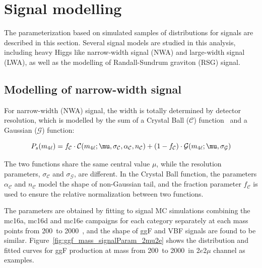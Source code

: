 \section{Signal modelling}
\label{sec:signal_model}

The parameterization based on simulated samples of \mfl distributions for signals are described in this section.
Several signal models are studied in this analysis, including heavy Higgs like narrow-width signal (NWA) and large-width signal (LWA), as well as the modelling of Randall-Sundrum graviton (RSG) signal.


\subsection{Modelling of narrow-width signal}
\label{sec:signal_nwa}

For narrow-width (NWA) signal, the \mfl width is totally determined by detector resolution, which is modelled 
by the sum of a Crystal Ball ($\mathcal{C}$) function~\cite{CrystalBall1,CrystalBall2} and a Gaussian ($\mathcal{G}$) function:

\begin{equation}
    \label{eq:cb_plus_g}
    P_{s} (\mfl) = f_{\mathcal{C}} \cdot \mathcal{C}(\mfl; \mu, \sigma_{\mathcal{C}}, \alpha_{\mathcal{C}}, n_{\mathcal{C}})
                   + (1 - f_{\mathcal{C}}) \cdot \mathcal{G}(\mfl; \mu, \sigma_{\mathcal{G}})
\end{equation}

The two functions share the same central value $\mu$, while the resolution parameters, $\sigma_{\mathcal{C}}$ and $\sigma_{\mathcal{G}}$, are different.
In the Crystal Ball function, the parameters $\alpha_{\mathcal{C}}$ and $n_{\mathcal{C}}$ model the shape of non-Gaussian tail,
and the fraction parameter $f_{\mathcal{C}}$ is used to ensure the relative normalization between two functions.

The parameters are obtained by fitting to signal MC simulations combining the mc16a, mc16d and mc16e campaigns for each category separately at each mass points from 200~\gev to 2000~\gev,
and the shape of ggF and VBF signals are found to be similar.
Figure~\ref{fig:ggf_mass_signalParam_2mu2e} shows the \mfl distribution and fitted curves for ggF production at mass from 200~\gev to 2000~\gev in 2$e$2$\mu$ channel as examples.

